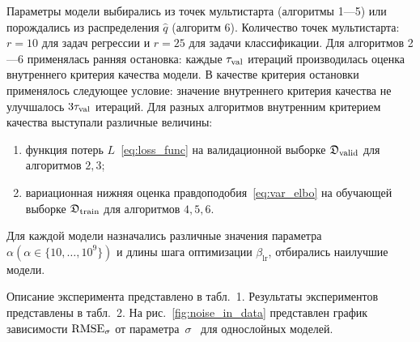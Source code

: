 Параметры модели выбирались из точек мультистарта (алгоритмы 1---5) или порождались из распределения $\hat{q}$ (алгоритм 6). Количество точек мультистарта: $r=10$ {для задач регрессии и $r=25$ для задачи классификации}.
Для алгоритмов 2---6 применялась ранняя остановка: каждые $\tau_\textnormal{val}$ итераций производилась оценка внутреннего критерия качества модели. В качестве критерия остановки применялось следующее условие: значение внутреннего критерия качества не улучшалось $3\tau_\textnormal{val}$ итераций. Для разных алгоритмов внутренним критерием качества выступали различные величины:
\begin{enumerate}[1)]
\item функция потерь $L$~\eqref{eq:loss_func} на валидационной выборке $\mathfrak{D}_\textnormal{valid}$ для алгоритмов $2,3$;
\item вариационная нижняя оценка правдоподобия~\eqref{eq:var_elbo} на обучающей выборке $\mathfrak{D}_\textnormal{train}$ для алгоритмов $4,5,6$.
\end{enumerate}

Для каждой модели назначались различные значения параметра $\alpha (\alpha \in \{10, \dots, 10^9\})$ и длины шага оптимизации $\beta_{\text{lr}}$, отбирались наилучшие модели. 



Описание эксперимента представлено в табл.~1. Результаты экспериментов представлены в табл.~2. На рис.~\ref{fig:noise_in_data} представлен график зависимости $\textnormal{RMSE}_{\sigma}$ от параметра~$\sigma$~{ для однослойных моделей}. 

